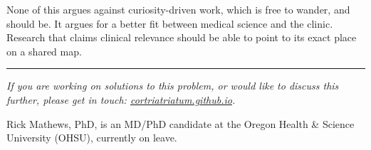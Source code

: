 \documentclass[12pt]{article}
\begin{document}
None of this argues against curiosity-driven work, which is free to wander, and should be. It argues for a better fit between medical science and the clinic. Research that claims clinical relevance should be able to point to its exact place on a shared map.

\vspace{14pt}
{\color{rule}\noindent\rule{0.3\textwidth}{0.4pt}}
\vspace{4pt}

{\fontsize{11.7}{16.38}\selectfont\setlength{\parindent}{0pt}\setlength{\parskip}{5pt}
{\itshape If you are working on solutions to this problem, or would like to discuss this further, please get in touch: \href{https://cortriatriatum.github.io/\#contact}{\upshape cortriatriatum.github.io}.}

Rick Mathews, PhD, is an MD/PhD candidate at the Oregon Health \& Science University (OHSU), currently on leave.

}
\end{document}

